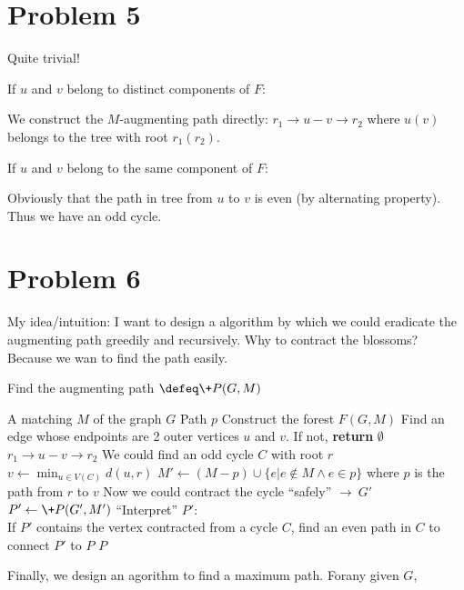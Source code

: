 \documentclass{article}
\begin{document}
\section*{Problem 5}
Quite trivial!

\vspace{1em}If $u$ and $v$ belong to distinct components of $F$:

\vspace{0.3em}
We construct the $M$-augmenting path directly: $r_1\to u-v \to r_2$ where $u(v)$ belongs to the tree with root $r_1(r_2)$.

\vspace{1em}If $u$ and $v$ belong to the same component of $F$:

\vspace{0.3em}
Obviously that the path in tree from $u$ to $v$ is even (by alternating property). Thus we have an odd cycle.

\section*{Problem 6}
My idea/intuition: I want to design a algorithm by which we could eradicate the augmenting path greedily and recursively. Why to contract the blossoms? Because we wan to find the path easily.
\begin{algorithm}[H]
	\caption{Find the augmenting path $\defeq \+P(G,M)$}
	\begin{algorithmic}[1]
		\renewcommand{\algorithmicrequire}{\textbf{Input:}}
		\renewcommand{\algorithmicensure}{\textbf{Output:}}
		\renewcommand{\algorithmiccomment}[1]{\hfill\textit{\textcolor{blue}{\##1}}}
		\label{path}
		\REQUIRE A matching $M$ of the graph $G$
		\ENSURE Path $p$
		\STATE Construct the forest $F(G,M)$
		\STATE Find an edge whose endpoints are 2 outer vertices $u$ and $v$. If not, \textbf{return} $\emptyset$
		\RETURN $r_1\to u-v \to r_2$
		\ELSE
		\STATE We could find an odd cycle $C$ with root $r$
		\STATE $v\gets \min_{u\in V(C)}d(u,r)$
		\STATE $M'\gets (M-p)\cup\{e|e\notin M\land e\in p\}$ where $p$ is the path from  $r$ to $v$
		\STATE Now we could contract the cycle ``safely'' $\to\ G'$
		\STATE $P'\gets \+P(G',M')$
		\STATE ``Interpret'' $P'$: \\
		If $P'$ contains the vertex contracted from a cycle $C$, find an even path in $C$ to connect $P'$ to $P$
		\RETURN $P$
		\ENDIF
	\end{algorithmic} 
\end{algorithm}
Finally, we design an agorithm to find a maximum path. Forany given $G$,
\end{document}
